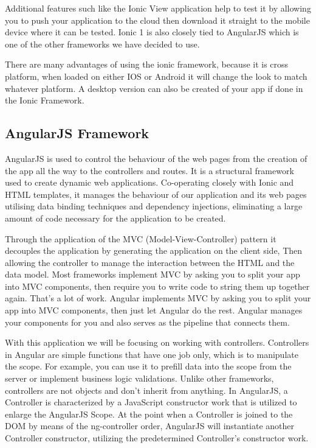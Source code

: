 Additional features such like the Ionic View application help to test it by allowing you to push your application to the cloud then download it straight to the mobile device where it can be tested. Ionic 1 is also closely tied to AngularJS which is one of the other frameworks we have decided to use.

There are many advantages of using the ionic framework, because it is cross platform, when loaded on either IOS or Android it will change the look to match whatever platform. A desktop version can also be created of your app if done in the Ionic Framework.


\subsection{AngularJS Framework}
AngularJS is used to control the behaviour of the web pages from the creation of the app all the way to the controllers and routes. It is a structural framework used to create dynamic web applications. Co-operating closely with Ionic and HTML templates, it manages the behaviour of our application and its web pages utilising data binding techniques and dependency injections, eliminating a large amount of code necessary for the application to be created.

Through the application of the MVC (Model-View-Controller) pattern it decouples the application by generating the application on the client side,
Then allowing the controller to manage the interaction between the HTML and the data model. Most frameworks implement MVC by asking you to split your app into MVC components, then require you to write code to string them up together again.\cite{angular} That’s a lot of work. Angular implements MVC by asking you to split your app into MVC components, then just let Angular do the rest. Angular manages your components for you and also serves as the pipeline that connects them.\cite{angular}

With this application we will be focusing on working with controllers. Controllers in Angular are simple functions that have one job only, which is to manipulate the scope.\cite{angular} For example, you can use it to prefill data into the scope from the server or implement business logic validations.\cite{angular} Unlike other frameworks, controllers are not objects and don’t inherit from anything.\cite{angular} In AngularJS, a Controller is characterized by a JavaScript constructor work that is utilized to enlarge the AngularJS Scope. At the point when a Controller is joined to the DOM by means of the ng-controller order, AngularJS will instantiate another Controller constructor, utilizing the predetermined Controller's constructor work.


